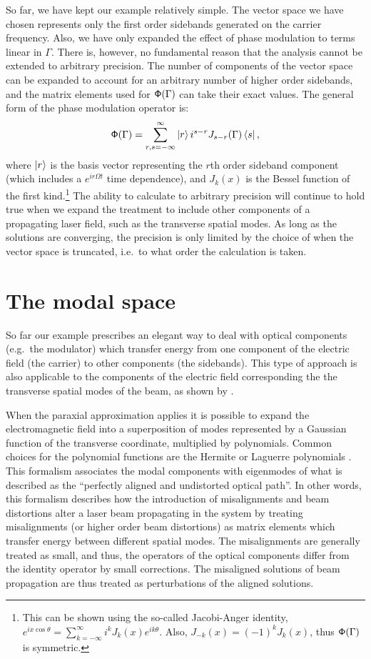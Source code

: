 So far, we have kept our example relatively simple. %
The vector space we have chosen represents only the first order sidebands generated on the carrier frequency. %
Also, we have only expanded the effect of phase modulation to terms linear in $\Gamma$. %
There is, however, no fundamental reason that the analysis cannot be extended to arbitrary precision. %
The number of components of the vector space can be expanded to account for an arbitrary number of higher order sidebands, and the matrix elements used for $\mathsf{\Phi}(\Gamma)$ can take their exact values. %
The general form of the phase modulation operator is:
\begin{equation}
\mathsf{\Phi}(\Gamma) = \sum_{r,s=-\infty}^\infty\left| r \right> i^{s-r} J_{s-r}(\Gamma) \left< s \right|,
\end{equation}
where $\left| r \right>$ is the basis vector representing the $r$th order sideband component (which includes a $e^{ir\Omega t}$ time dependence), and $J_k(x)$ is the Bessel function of the first kind.\footnote{This can be shown using the so-called Jacobi-Anger identity, $e^{ix\cos\theta}=\sum_{k=-\infty}^\infty i^kJ_k(x)e^{ik\theta}$. %
Also, $J_{-k}(x)=(-1)^kJ_k(x)$, thus $\mathsf{\Phi}(\Gamma)$ is symmetric.} The ability to calculate to arbitrary precision will continue to hold true when we expand the treatment to include other components of a propagating laser field, such as the transverse spatial modes. %
As long as the solutions are converging, the precision is only limited by the choice of when the vector space is truncated, i.e.\ to what order the calculation is taken.

\section{The modal space}
\label{sec:modalspace}
So far our example prescribes an elegant way to deal with optical components (e.g.\ the modulator) which transfer energy from one component of the electric field (the carrier) to other components (the sidebands). %
This type of approach is also applicable to the components of the electric field corresponding the the transverse spatial modes of the beam, as shown by \citet{Hefetz:97}.

When the paraxial approximation applies it is possible to expand the electromagnetic field into a superposition of modes represented by a Gaussian function of the transverse coordinate, multiplied by polynomials. %
Common choices for the polynomial functions are the Hermite or Laguerre polynomials \cite[Chap. %
16]{Siegman}. %
This formalism associates the modal components with eigenmodes of what is described as the ``perfectly aligned and undistorted optical path''. %
In other words, this formalism describes how the introduction of misalignments and beam distortions alter a laser beam propagating in the system by treating misalignments (or higher order beam distortions) as matrix elements which transfer energy between different spatial modes. %
The misalignments are generally treated as small, and thus, the operators of the optical components differ from the identity operator by small corrections. %
The misaligned solutions of beam propagation are thus treated as perturbations of the aligned solutions. %


